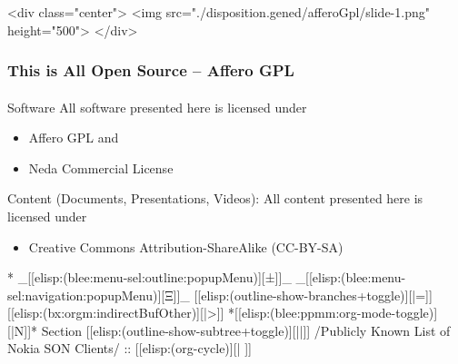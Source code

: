 \begin{whenOrg}
\begin{htmlonly}
\begin{frame}[fragile,plain,label=afferoGpl]
    \frametitle{}
    \framesubtitle{}
    \begin{rawhtml}
<div class="center">
<img src="./disposition.gened/afferoGpl/slide-1.png" height="500">
</div>
    \end{rawhtml}
\end{frame}
\end{htmlonly}

\begin{verblatex}

\begin{frame}[fragile,plain,label=afferoGpl]
    \frametitle{This is All Open Source -- Affero GPL}
    \framesubtitle{}


    \begin{alertblock}{Software}
      All software presented here is licensed under
      \begin{itemize}
        \item Affero GPL and
        \item Neda Commercial License
      \end{itemize}


    \end{alertblock}

    \bigskip

    \begin{exampleblock}{Content (Documents, Presentations, Videos):}
      All content presented here is licensed under
      \begin{itemize}
        \item Creative Commons Attribution-ShareAlike (CC-BY-SA)
      \end{itemize}
    \end{exampleblock}


\end{frame}
\end{verblatex}



\begin{whenOrg}
*  _[[elisp:(blee:menu-sel:outline:popupMenu)][±]]_ _[[elisp:(blee:menu-sel:navigation:popupMenu)][Ξ]]_ [[elisp:(outline-show-branches+toggle)][|=]] [[elisp:(bx:orgm:indirectBufOther)][|>]] *[[elisp:(blee:ppmm:org-mode-toggle)][|N]]*  Section    [[elisp:(outline-show-subtree+toggle)][||]]   /Publicly Known List of Nokia SON Clients/ ::  [[elisp:(org-cycle)][| ]]
\end{whenOrg}


\end{whenOrg}
